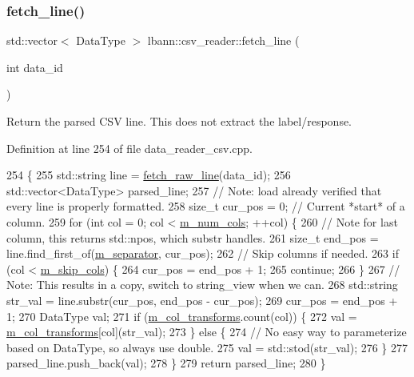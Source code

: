 \subsubsection{\texorpdfstring{fetch\+\_\+line()}{fetch\_line()}}
{\footnotesize\ttfamily std\+::vector$<$ Data\+Type $>$ lbann\+::csv\+\_\+reader\+::fetch\+\_\+line (\begin{DoxyParamCaption}\item[{int}]{data\+\_\+id }\end{DoxyParamCaption})\hspace{0.3cm}{\ttfamily [protected]}}

Return the parsed C\+SV line. This does not extract the label/response. 

Definition at line 254 of file data\+\_\+reader\+\_\+csv.\+cpp.


\begin{DoxyCode}
254                                                       \{
255   std::string line = \hyperlink{classlbann_1_1csv__reader_a8ea8669ec6c85de8d4127da7bb47d135}{fetch\_raw\_line}(data\_id);
256   std::vector<DataType> parsed\_line;
257   \textcolor{comment}{// Note: load already verified that every line is properly formatted.}
258   \textcolor{keywordtype}{size\_t} cur\_pos = 0;  \textcolor{comment}{// Current *start* of a column.}
259   \textcolor{keywordflow}{for} (\textcolor{keywordtype}{int} col = 0; col < \hyperlink{classlbann_1_1csv__reader_a7607d3f6b356538671147a0b8f7b09c8}{m\_num\_cols}; ++col) \{
260     \textcolor{comment}{// Note for last column, this returns std::npos, which substr handles.}
261     \textcolor{keywordtype}{size\_t} end\_pos = line.find\_first\_of(\hyperlink{classlbann_1_1csv__reader_abab4a731daa751856f083c117ac8862a}{m\_separator}, cur\_pos);
262     \textcolor{comment}{// Skip columns if needed.}
263     \textcolor{keywordflow}{if} (col < \hyperlink{classlbann_1_1csv__reader_a3a6cb698fbeb4abd0032e2b018bbb326}{m\_skip\_cols}) \{
264       cur\_pos = end\_pos + 1;
265       \textcolor{keywordflow}{continue};
266     \}
267     \textcolor{comment}{// Note: This results in a copy, switch to string\_view when we can.}
268     std::string str\_val = line.substr(cur\_pos, end\_pos - cur\_pos);
269     cur\_pos = end\_pos + 1;
270     DataType val;
271     \textcolor{keywordflow}{if} (\hyperlink{classlbann_1_1csv__reader_aad98a20225b1f2545de32b4c19c8285b}{m\_col\_transforms}.count(col)) \{
272       val = \hyperlink{classlbann_1_1csv__reader_aad98a20225b1f2545de32b4c19c8285b}{m\_col\_transforms}[col](str\_val);
273     \} \textcolor{keywordflow}{else} \{
274       \textcolor{comment}{// No easy way to parameterize based on DataType, so always use double.}
275       val = std::stod(str\_val);
276     \}
277     parsed\_line.push\_back(val);
278   \}
279   \textcolor{keywordflow}{return} parsed\_line;
280 \}
\end{DoxyCode}
